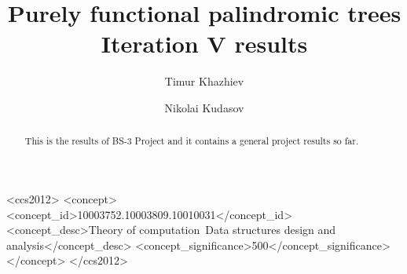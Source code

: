 \documentclass[sigconf]{acmart}
\begin{document}
\title{Purely functional palindromic trees \\ Iteration V results}


\author{Timur Khazhiev}

\author{Nikolai Kudasov}

\begin{abstract}
  This is the results of BS-3 Project and it contains
  a general project results so far.
\end{abstract}

%
%
\begin{CCSXML}
<ccs2012>
<concept>
<concept_id>10003752.10003809.10010031</concept_id>
<concept_desc>Theory of computation~Data structures design and analysis</concept_desc>
<concept_significance>500</concept_significance>
</concept>
</ccs2012>
\end{CCSXML}



\maketitle





\end{document}
